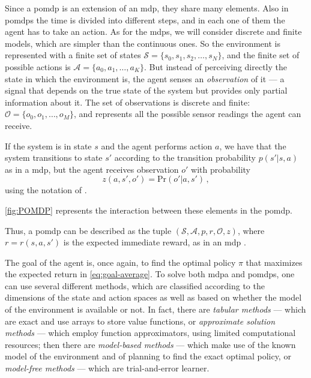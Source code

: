Since a \acrshort{pomdp} is an extension of an \acrshort{mdp}, they share many elements. Also in \acrshort{pomdp}s the time is divided into different steps, and in each one of them the agent has to take an action. As for the \acrshort{mdp}s, we will consider discrete and finite models, which are simpler than the continuous ones. So the environment is represented with a finite set of states $\mathcal S = \{ s_0, s_1, s_2, \ldots, s_N \}$, and the finite set of possible actions is $\mathcal A = \{a_0, a_1, \ldots, a_K\}$. But instead of perceiving directly the state in which the environment is, the agent senses an \emph{observation} of it --- a signal that depends on the true state of the system but provides only partial information about it. The set of observations is discrete and finite: $\mathcal O = \{o_0, o_1, \ldots, o_M\}$, and represents all the possible sensor readings the agent can receive.

If the system is in state $s$ and the agent performs action $a$, we have that the system transitions to state $s'$ according to the transition probability $p(s' | s, a)$ as in a \acrshort{mdp}, but the agent receives observation $o'$ with probability
\begin{equation}
    z(a,s',o') = \text{Pr}(o' | a, s') \, ,
\end{equation}
using the notation of \cite{Poupart2010}.

\autoref{fig:POMDP} represents the interaction between these elements in the \acrshort{pomdp}.

Thus, a \acrshort{pomdp} can be described as the tuple $(\mathcal S, \mathcal A, p, r, \mathcal O, z)$, where $r = r(s,a,s')$ is the expected immediate reward, as in an \acrshort{mdp} \cite{Kaelbling1998}.

The goal of the agent is, once again, to find the optimal policy $\pi$ that maximizes the expected return in \eqref{eq:goal-average}. To solve both \acrshort{mdp}a and \acrshort{pomdp}s, one can use several different methods, which are classified according to the dimensions of the state and action spaces as well as based on whether the model of the environment is available or not. In fact, there are \emph{tabular methods} --- which are exact and use arrays to store value functions, or \emph{approximate solution methods} --- which employ function approximators, using limited computational resources; then there are \emph{model-based methods} --- which make use of the known model of the environment and of planning to find the exact optimal policy, or \emph{model-free methods} --- which are trial-and-error learner.

